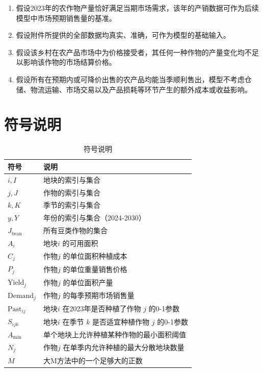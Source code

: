 \begin{enumerate}
	\item 假设2023年的农作物产量恰好满足当期市场需求，该年的产销数据可作为后续模型中市场预期销售量的基准。
	\item 假设附件所提供的全部数据均真实、准确，可作为模型的基础输入。
	\item 假设该乡村在农产品市场中为价格接受者，其任何一种作物的产量变化均不足以影响该作物的市场结算价格。
	\item 假设所有在预期内或可降价出售的农产品均能当季顺利售出，模型不考虑仓储、物流运输、市场交易以及产品损耗等环节产生的额外成本或收益影响。
\end{enumerate}


\section{符号说明}

\begin{table}[H]
	\centering
	\caption{符号说明}
	\begin{tabular}{ll}
		\toprule
		符号                 & 说明                                \\
		\midrule

		$i, I$             & 地块的索引与集合                          \\
		$j, J$             & 作物的索引与集合                          \\
		$k, K$             & 季节的索引与集合                          \\
		$y, Y$             & 年份的索引与集合（2024-2030）               \\
		$J_{\text{bean}}$  & 所有豆类作物的集合                         \\

		$A_i$              & 地块$i$ 的可用面积                       \\
		$C_j$              & 作物$j$ 的单位面积种植成本                   \\
		$P_j$              & 作物$j$ 的单位重量销售价格                   \\
		$\text{Yield}_j$   & 作物$j$ 的单位面积产量                     \\
		$\text{Demand}_j$  & 作物$j$ 的每季预期市场销售量                  \\
		$\text{Past}_{ij}$ & 地块$i$ 在2023年是否种植了作物 $j$ 的0-1参数    \\
		$S_{ijk}$          & 地块$i$ 在季节 $k$ 是否适宜种植作物 $j$ 的0-1参数 \\
		$A_{\min}$         & 单个地块上允许种植某种作物的最小面积阈值              \\
		$N_j$              & 作物$j$ 在单季内允许种植的最大分散地块数量           \\
		$M$                & 大M方法中的一个足够大的正数                    \\
		\bottomrule
	\end{tabular}
\end{table}